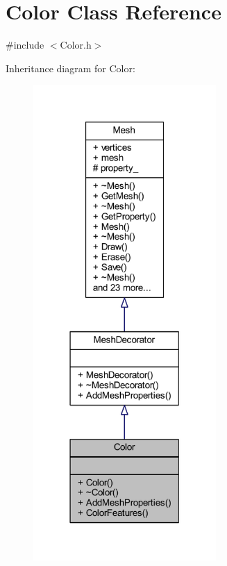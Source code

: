 \hypertarget{class_color}{}\section{Color Class Reference}
\label{class_color}


{\ttfamily \#include $<$Color.\+h$>$}



Inheritance diagram for Color\+:
\nopagebreak
\begin{figure}[H]
\begin{center}
\leavevmode
\includegraphics[width=197pt]{class_color__inherit__graph}
\end{center}
\end{figure}


